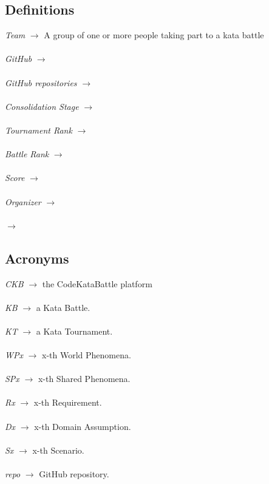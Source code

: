 \documentclass[11pt]{report}
\begin{document}
    \subsection{Definitions}
    \emph{Team} $\rightarrow$ A group of one or more people taking part to a kata battle
    \\ \\
    \emph{GitHub} $\rightarrow$ 
    \\ \\
    \emph{GitHub repositories} $\rightarrow$ 
    \\ \\
    \emph{Consolidation Stage} $\rightarrow$ 
    \\ \\
    \emph{Tournament Rank} $\rightarrow$ 
    \\ \\
    \emph{Battle Rank} $\rightarrow$ 
    \\ \\
    \emph{Score} $\rightarrow$ 
    \\ \\
    \emph{Organizer} $\rightarrow$ 
    \\ \\
    \emph{} $\rightarrow$ 

    \subsection{Acronyms}
    \emph{CKB}  $\rightarrow$ the CodeKataBattle platform
    \\ \\
    \emph{KB}   $\rightarrow$ a Kata Battle.
    \\ \\
    \emph{KT}   $\rightarrow$ a Kata Tournament.
    \\ \\
    \emph{WPx}  $\rightarrow$ x-th World Phenomena.
    \\ \\
    \emph{SPx}  $\rightarrow$ x-th Shared Phenomena.
    \\ \\
    \emph{Rx}   $\rightarrow$ x-th Requirement.
    \\ \\
    \emph{Dx}   $\rightarrow$ x-th Domain Assumption.
    \\ \\
    \emph{Sx}   $\rightarrow$ x-th Scenario.
    \\ \\
    \emph{repo} $\rightarrow$ GitHub repository.
\end{document}
